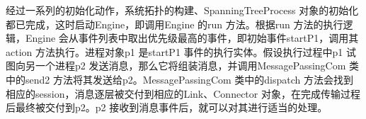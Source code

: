     经过一系列的初始化动作，系统拓扑的构建、SpanningTreeProcess 对象的初始化都已完成，这时启动Engine，即调用Engine 的run 方法。根据run 方法的执行逻辑，Engine 会从事件列表中取出优先级最高的事件，即初始事件startP1，调用其action 方法执行。进程对象p1 是startP1 事件的执行实体。假设执行过程中p1 试图向另一个进程p2 发送消息，那么它将组装消息，并调用MessagePassingCom 类中的send2 方法将其发送给p2。MessagePassingCom 类中的dispatch 方法会找到相应的session，消息逐层被交付到相应的Link、Connector 对象，在完成传输过程后最终被交付到p2。p2 接收到消息事件后，就可以对其进行适当的处理。
